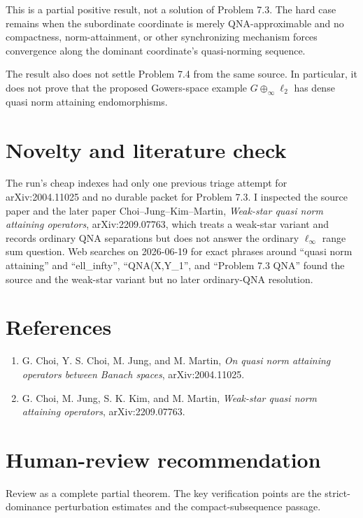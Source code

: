 \documentclass[11pt]{article}
\begin{document}
This is a partial positive result, not a solution of Problem 7.3. The hard
case remains when the subordinate coordinate is merely QNA-approximable and no
compactness, norm-attainment, or other synchronizing mechanism forces
convergence along the dominant coordinate's quasi-norming sequence.

The result also does not settle Problem 7.4 from the same source. In
particular, it does not prove that the proposed Gowers-space example
$G\oplus_\infty \ell_2$ has dense quasi norm attaining endomorphisms.

\section*{Novelty and literature check}

The run's cheap indexes had only one previous triage attempt for arXiv:2004.11025
and no durable packet for Problem 7.3. I inspected the source paper and the
later paper Choi--Jung--Kim--Martin, \emph{Weak-star quasi norm attaining
operators}, arXiv:2209.07763, which treats a weak-star variant and records
ordinary QNA separations but does not answer the ordinary $\ell_\infty$ range
sum question. Web searches on 2026-06-19 for exact phrases around
``quasi norm attaining'' and ``ell\_infty'', ``QNA(X,Y\_1'', and
``Problem 7.3 QNA'' found the source and the weak-star variant but no later
ordinary-QNA resolution.

\section*{References}

\begin{enumerate}
\item G. Choi, Y. S. Choi, M. Jung, and M. Martin, \emph{On quasi norm attaining
operators between Banach spaces}, arXiv:2004.11025.
\item G. Choi, M. Jung, S. K. Kim, and M. Martin, \emph{Weak-star quasi norm
attaining operators}, arXiv:2209.07763.
\end{enumerate}

\section*{Human-review recommendation}

Review as a complete partial theorem. The key verification points are the
strict-dominance perturbation estimates and the compact-subsequence passage.
\end{document}
